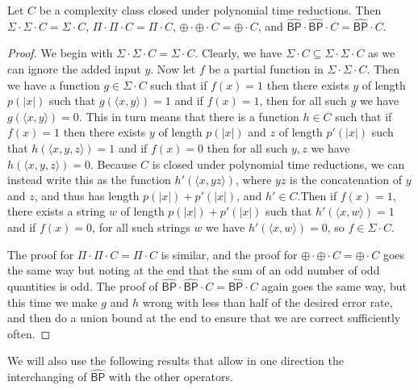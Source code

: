 \documentclass[11pt]{article}
\newcommand{\strongbp}{\widehat{\textsf{BP}}}
\newcommand{\parity}{\oplus}
\begin{document}
\begin{lemma}\label{collapse}
Let $C$ be a complexity class closed under polynomial time reductions. Then $\Sigma\cdot\Sigma\cdot C = \Sigma\cdot C$, $\Pi\cdot\Pi\cdot C = \Pi\cdot C$, $\parity\cdot\parity\cdot C = \parity\cdot C$, and $\strongbp\cdot\strongbp\cdot C = \strongbp \cdot C$.
\end{lemma}
\begin{proof}
We begin with $\Sigma\cdot\Sigma\cdot C = \Sigma\cdot C$. Clearly, we have $\Sigma\cdot C \subseteq \Sigma\cdot\Sigma\cdot C$ as we can ignore the added input $y$. Now let $f$ be a partial function in $\Sigma\cdot\Sigma\cdot C$. Then we have a function $g \in \Sigma \cdot C$ such that if $f(x) = 1$ then there exists $y$ of length $p(|x|)$ such that $g(\langle x,y\rangle) = 1$ and if $f(x) = 1$, then for all such $y$ we have $g(\langle x,y\rangle) = 0$. This in turn means that there is a function $h \in C$ such that if $f(x) = 1$ then there exists $y$ of length $p(|x|)$ and $z$ of length $p'(|x|)$ such that $h(\langle x, y, z\rangle) = 1$ and if $f(x) = 0$ then for all such $y,z$ we have $h(\langle x,y,z\rangle) = 0$. Because $C$ is closed under polynomial time reductions, we can instead write this as the function $h'(\langle x,yz\rangle)$, where $yz$ is the concatenation of $y$ and $z$, and thus has length $p(|x|) + p'(|x|)$, and $h' \in C$.Then if $f(x) = 1$, there exists a string $w$ of length $p(|x|)+p'(|x|)$ such that $h'(\langle x,w\rangle) = 1$ and if $f(x) = 0$, for all such strings $w$ we have $h'(\langle x,w\rangle) = 0$, so $f \in \Sigma \cdot C$.

The proof for $\Pi\cdot\Pi\cdot C = \Pi\cdot C$ is similar, and the proof for $\parity\cdot\parity\cdot C = \parity\cdot C$ goes the same way but noting at the end that the sum of an odd number of odd quantities is odd. The proof of $\strongbp\cdot\strongbp\cdot C = \strongbp\cdot C$ again goes the same way, but this time we make $g$ and $h$ wrong with less than half of the desired error rate, and then do a union bound at the end to ensure that we are correct sufficiently often.
\end{proof}

We will also use the following results that allow in one direction the interchanging of $\strongbp$ with the other operators.
\end{document}
